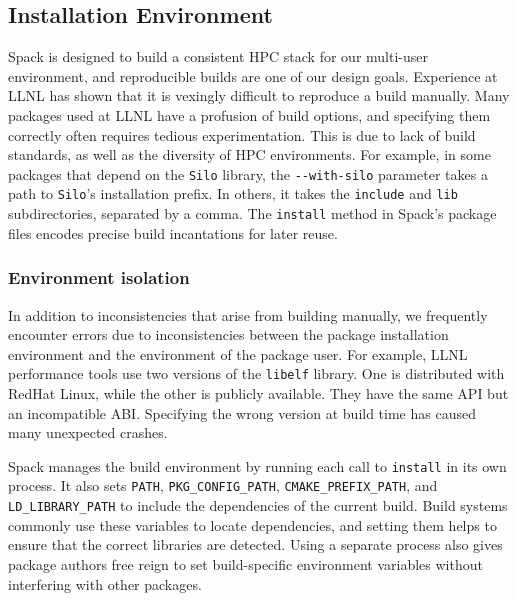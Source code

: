 
\subsection{Installation Environment}

Spack is designed to build a consistent HPC stack for our multi-user
environment, and reproducible builds are one of our design goals.
Experience at LLNL has shown that it is vexingly difficult to reproduce
a build manually.
%
Many packages used at LLNL have a profusion of build options, and specifying
them correctly often requires tedious experimentation.  This is due to lack of
build standards, as well as the diversity of HPC environments.
For example, in some packages that depend on the {\tt Silo} library,
the \verb|--with-silo| parameter takes a path to {\tt Silo}'s installation prefix.
In others, it takes the {\tt include} and {\tt lib} subdirectories,
separated by a comma.
The {\tt install} method in Spack's package files encodes precise build
incantations for later reuse.

\subsubsection{Environment isolation}
In addition to inconsistencies that arise from building manually, we
frequently encounter errors due to inconsistencies between the package
installation environment and the environment of the package user.
%
For example, LLNL performance tools use two versions of the {\tt libelf}
library. One is distributed with RedHat Linux, while the
other is publicly available. They have the same API but an incompatible ABI.
Specifying the wrong version at build time has caused many
unexpected crashes.

Spack manages the build environment by running each call to {\tt install}
in its own process.  It also sets
{\tt PATH}, {\tt PKG\_CONFIG\_PATH}, {\tt CMAKE\_PREFIX\_PATH}, and
{\tt LD\_LIBRARY\_PATH} to include the dependencies of the current build.
Build systems commonly use these variables to locate dependencies,
and setting them helps to ensure that the correct libraries are detected.
Using a separate process also gives package authors 
free reign to set build-specific environment variables without interfering
with other packages.

